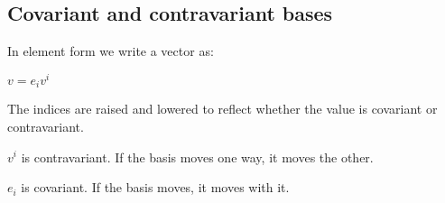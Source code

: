 
\subsection{Covariant and contravariant bases}

In element form we write a vector as:

\(v=e_iv^i\)

The indices are raised and lowered to reflect whether the value is covariant or contravariant.

\(v^i\) is contravariant. If the basis moves one way, it moves the other.

\(e_i\) is covariant. If the basis moves, it moves with it.

